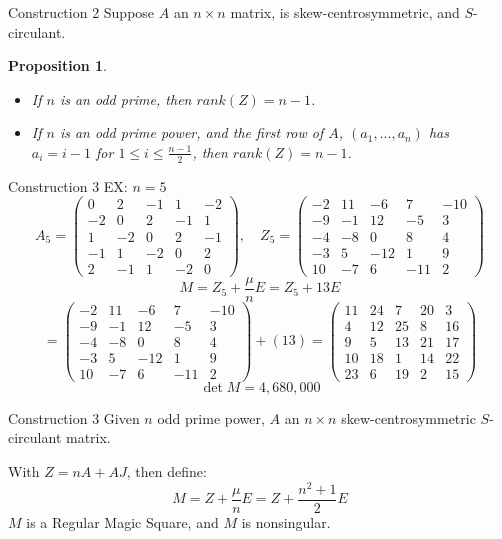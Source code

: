 \documentclass[10pt]{beamer}
\newtheorem{proposition}[theorem]{Proposition}
\begin{document}
\begin{frame}{Construction 2} %
    Suppose $A$ an $n\times n$ matrix, is skew-centrosymmetric, and $S$-circulant.
    \begin{proposition}
        \begin{itemize}
            \item If $n$ is an odd prime, then $rank(Z)=n-1$.
            \item If $n$ is an odd prime power, and the first row of $A$, $(a_1,...,a_n)$ has $a_i = i-1$ for $1\leq i\leq \frac{n-1}{2}$, then $rank(Z)=n-1$.
        \end{itemize}
    \end{proposition}
\end{frame}
\begin{frame}{Construction 3}
    EX: $n=5$
    \[A_{5}=\begin{pmatrix}
        0&2&-1&1&-2\\
        -2&0&2&-1&1\\
        1&-2&0&2&-1\\
        -1&1&-2&0&2\\
        2&-1&1&-2&0
    \end{pmatrix},\quad Z_5=\begin{pmatrix}
        -2&11&-6&7&-10\\
        -9&-1&12&-5&3\\
        -4&-8&0&8&4\\
        -3&5&-12&1&9\\
        10&-7&6&-11&2
    \end{pmatrix}\]
    \[M=Z_5 + \frac{\mu}{n}E = Z_5 + 13E\]
    \[ = \begin{pmatrix}
        -2&11&-6&7&-10\\
        -9&-1&12&-5&3\\
        -4&-8&0&8&4\\
        -3&5&-12&1&9\\
        10&-7&6&-11&2
    \end{pmatrix} + (13) = \begin{pmatrix}
        11&24&7&20&3\\
        4&12&25&8&16\\
        9&5&13&21&17\\
        10&18&1&14&22\\
        23&6&19&2&15
    \end{pmatrix}\]
    \[\det M=4,680,000\]
\end{frame}
\begin{frame}{Construction 3}
    Given $n$ odd prime power, $A$ an $n\times n$ skew-centrosymmetric $S$-circulant matrix.
    \begin{theorem}
        With $Z=nA+AJ$, then define:
        $$M=Z+\frac{\mu}{n}E = Z+\frac{n^2+1}{2}E$$
        $M$ is a Regular Magic Square, and $M$ is nonsingular.
    \end{theorem}
\end{frame}
\end{document}
